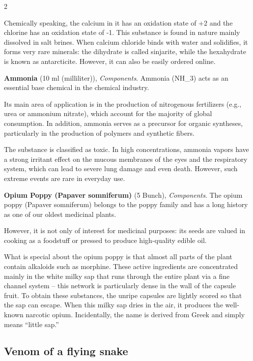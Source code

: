 \begin{multicols}{2}
\begin{denseitemize}
Chemically speaking, the calcium in it has an oxidation state of +2 and the chlorine has an oxidation state of -1. This substance is found in nature mainly dissolved in salt brines. When calcium chloride binds with water and solidifies, it forms very rare minerals: the dihydrate is called sinjarite, while the hexahydrate is known as antarcticite. However, it can also be easily ordered online.
        \item \textbf{Ammonia} (10 ml (milliliter)), \textit{Components}.
        Ammonia (NH\_3) acts as an essential base chemical in the chemical industry.

Its main area of application is in the production of nitrogenous fertilizers (e.g., urea or ammonium nitrate), which account for the majority of global consumption. In addition, ammonia serves as a precursor for organic syntheses, particularly in the production of polymers and synthetic fibers.

The substance is classified as toxic. In high concentrations, ammonia vapors have a strong irritant effect on the mucous membranes of the eyes and the respiratory system, which can lead to severe lung damage and even death. However, such extreme events are rare in everyday use.
        \item \textbf{Opium Poppy (Papaver somniferum)} (5 Bunch), \textit{Components}.
        The opium poppy (Papaver somniferum) belongs to the poppy family and has a long history as one of our oldest medicinal plants.

However, it is not only of interest for medicinal purposes: its seeds are valued in cooking as a foodstuff or pressed to produce high-quality edible oil.

What is special about the opium poppy is that almost all parts of the plant contain alkaloids such as morphine. These active ingredients are concentrated mainly in the white milky sap that runs through the entire plant via a fine channel system – this network is particularly dense in the wall of the capsule fruit. To obtain these substances, the unripe capsules are lightly scored so that the sap can escape. When this milky sap dries in the air, it produces the well-known narcotic opium. Incidentally, the name is derived from Greek and simply means “little sap.”
    \end{denseitemize}


    \subsection*{Venom of a flying snake}


\end{multicols}
